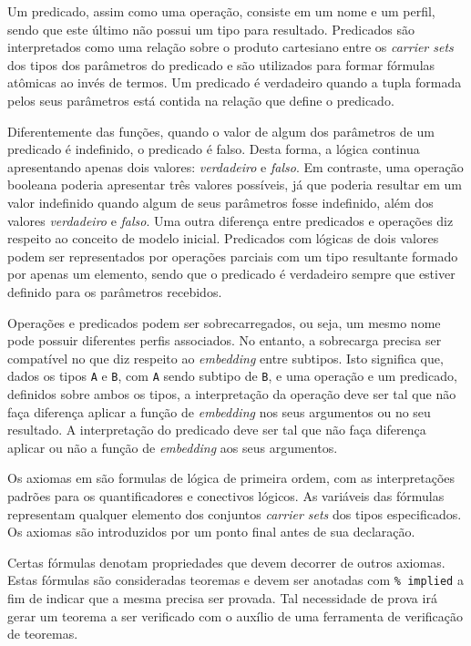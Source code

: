 Um predicado, assim como uma operação, consiste em um nome e um perfil, sendo que este último não possui um tipo para resultado.
Predicados são interpretados como uma relação sobre o produto cartesiano entre os \textit{carrier sets} dos tipos dos parâmetros do predicado e são utilizados para formar fórmulas atômicas ao invés de termos.
Um predicado é verdadeiro quando a tupla formada pelos seus parâmetros está contida na relação que define o predicado.

Diferentemente das funções, quando o valor de algum dos parâmetros de um predicado é indefinido, o predicado é falso.
Desta forma, a lógica continua apresentando apenas dois valores: \textit{verdadeiro} e \textit{falso}.
Em contraste, uma operação booleana poderia apresentar três valores possíveis, já que poderia resultar em um valor indefinido quando algum de seus parâmetros fosse indefinido, além dos valores \textit{verdadeiro} e \textit{falso}.
Uma outra diferença entre predicados e operações diz respeito ao conceito de modelo inicial.
Predicados com lógicas de dois valores podem ser representados por operações parciais com um tipo resultante formado por apenas um elemento, sendo que o predicado é verdadeiro sempre que estiver definido para os parâmetros recebidos.

Operações e predicados podem ser sobrecarregados, ou seja, um mesmo nome pode possuir diferentes perfis associados.
No entanto, a sobrecarga precisa ser compatível no que diz respeito ao \textit{embedding} entre subtipos.
Isto significa que, dados os tipos \Verb.A. e \Verb.B., com \Verb.A. sendo subtipo de \Verb.B., e uma operação e um predicado, definidos sobre ambos os tipos, a interpretação da operação deve ser tal que não faça diferença aplicar a função de \textit{embedding} nos seus argumentos ou no seu resultado. A interpretação do predicado deve ser tal que não faça diferença aplicar ou não a função de \textit{embedding} aos seus argumentos.

Os axiomas em \CASL são formulas de lógica de primeira ordem, com as interpretações padrões para os quantificadores e conectivos lógicos.
As variáveis das fórmulas representam qualquer elemento dos conjuntos \textit{carrier sets} dos tipos especificados.
Os axiomas são introduzidos por um ponto final antes de sua declaração.

Certas fórmulas denotam propriedades que devem decorrer de outros axiomas.
Estas fórmulas são consideradas teoremas e devem ser anotadas com \Verb.%
Tal necessidade de prova irá gerar um teorema a ser verificado com o auxílio de uma ferramenta de verificação de teoremas.

